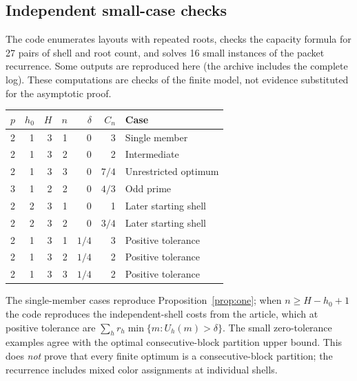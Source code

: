 \documentclass[11pt]{article}
\theoremstyle{remark}\newtheorem{remark}[theorem]{Remark}
\begin{document}
\subsection*{Independent small-case checks}
The code enumerates layouts with repeated roots, checks the capacity formula for 27 pairs of shell and root count, and solves 16 small instances of the packet recurrence. Some outputs are reproduced here (the archive includes the complete log). These computations are checks of the finite model, not evidence substituted for the asymptotic proof.
\begin{center}
\begin{tabular}{rrrrrrl}
\toprule
$p$ & $h_0$ & $H$ & $n$ & $\delta$ & $C_n$ & Case \\
\midrule
2&1&3&1&0&3&Single member\\
2&1&3&2&0&2&Intermediate\\
2&1&3&3&0&$7/4$&Unrestricted optimum\\
3&1&2&2&0&$4/3$&Odd prime\\
2&2&3&1&0&1&Later starting shell\\
2&2&3&2&0&$3/4$&Later starting shell\\
2&1&3&1&$1/4$&3&Positive tolerance\\
2&1&3&2&$1/4$&2&Positive tolerance\\
2&1&3&3&$1/4$&2&Positive tolerance\\
\bottomrule
\end{tabular}
\end{center}
The single-member cases reproduce Proposition~\ref{prop:one}; when $n\ge H-h_0+1$ the code reproduces the independent-shell costs from the article, which at positive tolerance are $\sum_h r_h\min\{m:U_h(m)>\delta\}$. The small zero-tolerance examples agree with the optimal consecutive-block partition upper bound. This does \emph{not} prove that every finite optimum is a consecutive-block partition; the recurrence includes mixed color assignments at individual shells.
\end{document}
